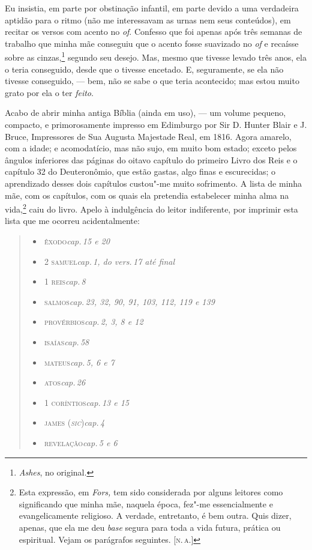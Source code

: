 Eu insistia, em parte por obstinação infantil, em parte devido a uma
verdadeira aptidão para o ritmo (não me interessavam as urnas nem seus
conteúdos), em recitar os versos com acento no \textit{of}. Confesso que
foi apenas após três semanas de trabalho que minha mãe conseguiu que o
acento fosse suavizado no \textit{of} e recaísse sobre as
cinzas,\footnote{\textit{Ashes}, no original.} segundo seu
desejo. Mas, mesmo que tivesse levado três anos, ela o teria conseguido,
desde que o tivesse encetado. E, seguramente, se ela não tivesse
conseguido, --- bem, não se sabe o que teria acontecido; mas estou muito
grato por ela o ter \textit{feito}.

Acabo de abrir minha antiga Bíblia (ainda em uso), --- um volume
pequeno, compacto, e primorosamente impresso em Edimburgo por Sir D.
Hunter Blair e J. Bruce, Impressores de Sua Augusta Majestade Real, em
1816. Agora amarelo, com a idade; e acomodatício, mas não sujo, em muito
bom estado; exceto pelos ângulos inferiores das páginas do oitavo capítulo
do primeiro Livro dos Reis e o capítulo 32 do Deuteronômio, que estão gastas,
algo finas e escurecidas; o aprendizado desses dois capítulos custou"-me
muito sofrimento. A lista de minha mãe, com os capítulos, com os quais
ela pretendia estabelecer minha alma na vida,\footnote{Esta expressão, em
  \textit{Fors,} tem sido considerada por alguns leitores como
  significando que minha mãe, naquela época, fez"-me essencialmente e
  evangelicamente religioso. A verdade, entretanto, é bem outra. Quis
  dizer, apenas, que ela me deu \textit{base} segura para toda a vida
  futura, prática ou espiritual. Vejam os parágrafos seguintes. {[}\textsc{n.\,a.}{]}} caiu do livro. Apelo à indulgência do leitor indiferente, por
imprimir esta lista que me ocorreu acidentalmente: %

\medskip

\begin{quote}
\begin{itemize}
\item \,\textsc{êxodo}\quad \textit{cap.\,15 e 20}
\item \,\textsc{2 samuel}\quad \textit{cap.\,1, do vers.\,17 até final}
\item \,\textsc{1 reis}\quad \textit{cap.\,8}
\item \,\textsc{salmos}\quad \textit{cap.\,23, 32, 90, 91, 103, 112, 119 e 139}
\item \,\textsc{provérbios}\quad \textit{cap.\,2, 3, 8 e 12}
\item \,\textsc{isaías}\quad \textit{cap.\,58}
\item \,\textsc{mateus}\quad \textit{cap.\,5, 6 e 7}
\item \,\textsc{atos}\quad \textit{cap.\,26}
\item \,\textsc{1 coríntios}\quad \textit{cap.\,13 e 15}
\item \,\textsc{james (\textit{sic})}\quad \textit{cap.\,4}
\item \,\textsc{revelação}\quad \textit{cap.\,5 e 6}
\end{itemize}
\end{quote}

